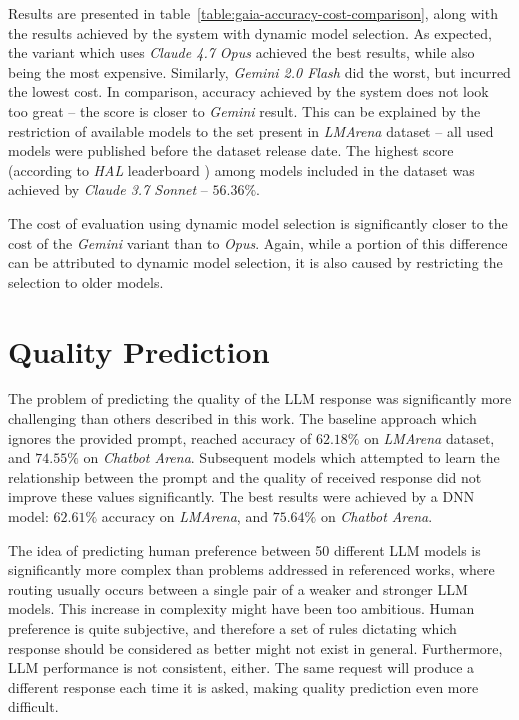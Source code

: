 \documentclass[a4paper,11pt,twoside]{report}
\theoremstyle{definition}
\begin{document}
Results are presented in table~\ref{table:gaia-accuracy-cost-comparison}, along with the results achieved by the system with dynamic model selection. As expected, the variant which uses \textit{Claude 4.7 Opus} achieved the best results, while also being the most expensive. Similarly, \textit{Gemini 2.0 Flash} did the worst, but incurred the lowest cost. In comparison, accuracy achieved by the system does not look too great -- the score is closer to \textit{Gemini} result. This can be explained by the restriction of available models to the set present in \textit{LMArena} dataset -- all used models were published before the dataset release date. The highest score (according to \textit{HAL} leaderboard \cite{kapoor2026hal}) among models included in the dataset was achieved by \textit{Claude 3.7 Sonnet} -- $56.36 \%$. 

The cost of evaluation using dynamic model selection is significantly closer to the cost of the \textit{Gemini} variant than to \textit{Opus}. Again, while a portion of this difference can be attributed to dynamic model selection, it is also caused by restricting the selection to older models.

\section{Quality Prediction}

The problem of predicting the quality of the LLM response was significantly more challenging than others described in this work. The baseline approach which ignores the provided prompt, reached accuracy of $62.18 \%$ on \textit{LMArena} dataset, and $74.55 \%$ on \textit{Chatbot Arena}. Subsequent models which attempted to learn the relationship between the prompt and the quality of received response did not improve these values significantly. The best results were achieved by a DNN model: $62.61 \%$ accuracy on \textit{LMArena}, and $75.64 \%$ on \textit{Chatbot Arena}.

The idea of predicting human preference between 50 different LLM models is significantly more complex than problems addressed in referenced works, where routing usually occurs between a single pair of a weaker and stronger LLM models. This increase in complexity might have been too ambitious. Human preference is quite subjective, and therefore a set of rules dictating which response should be considered as better might not exist in general. Furthermore, LLM performance is not consistent, either. The same request will produce a different response each time it is asked, making quality prediction even more difficult.
\end{document}
